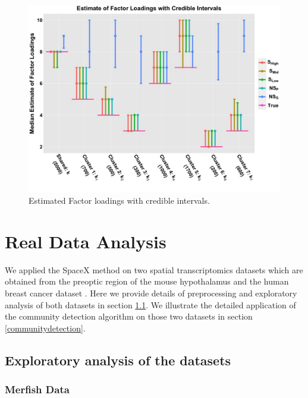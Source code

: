 \documentclass[
]{book}
\begin{document}
\begin{figure}

{\centering \includegraphics[width=0.8\linewidth]{images/Median_Loading_plot} 

}

\caption{Estimated Factor loadings with credible intervals.}\label{fig:factor2}
\end{figure}

\hypertarget{realdata}{%
\chapter{Real Data Analysis}\label{realdata}}

We applied the SpaceX method on two spatial transcriptomics datasets which are obtained from the preoptic region of the mouse hypothalamus \citep{Moffitteaau5324} and the human breast cancer dataset \citep{staahl2016visualization}. Here we provide details of preprocessing and exploratory analysis of both datasets in section \ref{exploratory}. We illustrate the detailed application of the community detection algorithm on those two datasets in section \ref{communitydetection}.

\hypertarget{exploratory}{%
\section{Exploratory analysis of the datasets}\label{exploratory}}

\hypertarget{merfish-data}{%
\subsection{Merfish Data}\label{merfish-data}}
\end{document}
